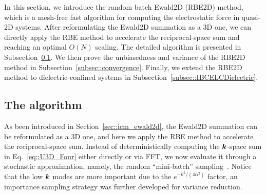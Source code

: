 In this section, we introduce the random batch Ewald2D (RBE2D) method, which is a mesh-free fast algorithm for computing the electrostatic force in quasi-2D systems.
After reformulating the Ewald2D summation as a 3D one, we can directly apply the RBE method to accelerate the reciprocal-space sum and reaching an optimal $O(N)$ scaling.
The detailed algorithm is presented in Subsection~\ref{subsec::RBE2D_algorithm}.
We then prove the unbiasedness and variance of the RBE2D method in Subsection~\ref{subsec::convergence}.
Finally, we extend the RBE2D method to dielectric-confined systems in Subsection~\ref{subsec::IBCELCDielectric}.

\subsection{The algorithm}\label{subsec::RBE2D_algorithm}

As been introduced in Section~\ref{sec::icm_ewald2d}, the Ewald2D summation can be reformulated as a 3D one, and here we apply the RBE method to accelerate the reciprocal-space sum.
Instead of deterministically computing the $\boldsymbol{k}$-space sum in Eq.~\eqref{eq::U3D_Four} either directly or via FFT, we now evaluate it through a stochastic approximation, namely, the random ``mini-batch'' sampling~\cite{jin2020random}. 
Notice that the low $\boldsymbol{k}$ modes are more important due to the $e^{-k^2/(4\alpha^2)}$ factor, an importance sampling strategy was further developed for variance reduction.

